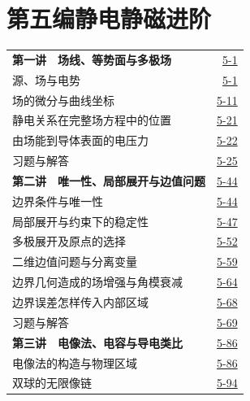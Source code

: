 \section*{第五编\quad 静电静磁进阶}
\begin{longtable}{@{}p{}r@{}}
\textbf{第一讲　场线、等势面与多极场}&\href{course-page:5:3}{5-1}\\[2pt]
\hspace{1em}源、场与电势&\href{course-page:5:3}{5-1}\\[2pt]
\hspace{1em}场的微分与曲线坐标&\href{course-page:5:13}{5-11}\\[2pt]
\hspace{1em}静电关系在完整场方程中的位置&\href{course-page:5:23}{5-21}\\[2pt]
\hspace{1em}由场能到导体表面的电压力&\href{course-page:5:24}{5-22}\\[2pt]
\hspace{1em}习题与解答&\href{course-page:5:27}{5-25}\\[2pt]
\textbf{第二讲　唯一性、局部展开与边值问题}&\href{course-page:5:46}{5-44}\\[2pt]
\hspace{1em}边界条件与唯一性&\href{course-page:5:46}{5-44}\\[2pt]
\hspace{1em}局部展开与约束下的稳定性&\href{course-page:5:49}{5-47}\\[2pt]
\hspace{1em}多极展开及原点的选择&\href{course-page:5:54}{5-52}\\[2pt]
\hspace{1em}二维边值问题与分离变量&\href{course-page:5:61}{5-59}\\[2pt]
\hspace{1em}边界几何造成的场增强与角模衰减&\href{course-page:5:66}{5-64}\\[2pt]
\hspace{1em}边界误差怎样传入内部区域&\href{course-page:5:70}{5-68}\\[2pt]
\hspace{1em}习题与解答&\href{course-page:5:71}{5-69}\\[2pt]
\textbf{第三讲　电像法、电容与导电类比}&\href{course-page:5:88}{5-86}\\[2pt]
\hspace{1em}电像法的构造与物理区域&\href{course-page:5:88}{5-86}\\[2pt]
\hspace{1em}双球的无限像链&\href{course-page:5:96}{5-94}\\[2pt]

\end{longtable}
